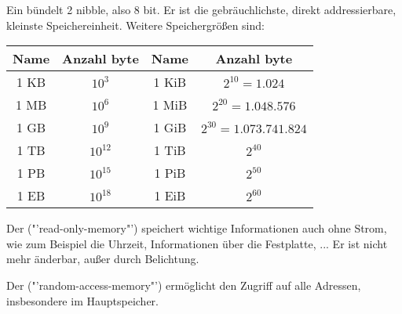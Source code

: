 Ein  bündelt 2 nibble, also 8 bit. Er ist die gebräuchlichste, direkt addressierbare, kleinste Speichereinheit. Weitere Speichergrößen sind:
\begin{center}
	\begin{tabular}{c|c||c|c}
		\textbf{Name} & \textbf{Anzahl byte} & \textbf{Name} & \textbf{Anzahl byte} \\
		\hline
		1 KB & $10^3$ & 1 KiB & $2^{10}=1.024$ \\
		1 MB & $10^6$ & 1 MiB & $2^{20}=1.048.576$ \\
		1 GB & $10^9$ & 1 GiB & $2^{30}=1.073.741.824$ \\
		1 TB & $10^{12}$ & 1 TiB & $2^{40}$ \\
		1 PB & $10^{15}$ & 1 PiB & $2^{50}$ \\
		1 EB & $10^{18}$ & 1 EiB & $2^{60}$
	\end{tabular}
\end{center}

Der  ("'read-only-memory"') speichert wichtige Informationen auch ohne Strom, wie zum Beispiel die Uhrzeit, Informationen über die Festplatte, ... Er ist nicht mehr änderbar, außer durch Belichtung.

Der  ("'random-access-memory"') ermöglicht den Zugriff auf alle Adressen, insbesondere im Hauptspeicher.